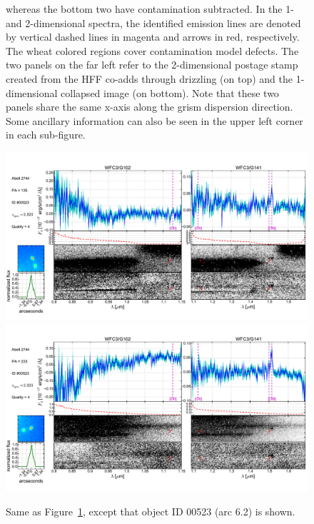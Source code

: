 \begin{figure}
{    whereas the bottom two have contamination subtracted. In the 1- and 2-dimensional spectra, the identified
    emission lines are denoted by vertical dashed lines in magenta and arrows in red, respectively. The wheat
    colored regions cover contamination model defects. The two panels on the far left refer to the 2-dimensional
    postage stamp created from the HFF co-adds through drizzling (on top) and the 1-dimensional collapsed image
    (on bottom). Note that these two panels share the same x-axis along the grism dispersion direction. Some
    ancillary information can also be seen in the upper left corner in each sub-figure.\label{fig:ELarc6.1}}
\end{figure}

\begin{figure}
    \centering
    \includegraphics[width=\textwidth]{fig/clA2744_id523_pa135_zsQ4.pdf}\\
    \includegraphics[width=\textwidth]{fig/clA2744_id523_pa233_zsQ4.pdf}
    \caption{Same as Figure~\ref{fig:ELarc6.1}, except that object ID 00523 (arc 6.2) is shown.}
    \label{fig:ELarc6.2}
\end{figure}

